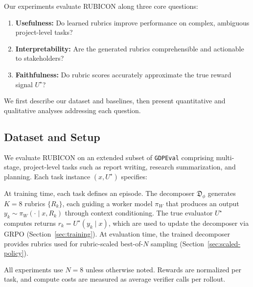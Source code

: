 \documentclass[sigconf]{acmart}
\begin{document}
Our experiments evaluate RUBICON along three core questions:

\begin{enumerate}
    \item \textbf{Usefulness:} Do learned rubrics improve performance on complex, ambiguous project-level tasks?
    \item \textbf{Interpretability:} Are the generated rubrics comprehensible and actionable to stakeholders?
    \item \textbf{Faithfulness:} Do rubric scores accurately approximate the true reward signal \(U^\star\)?
\end{enumerate}

We first describe our dataset and baselines, then present quantitative and qualitative analyses addressing each question.

\subsection{Dataset and Setup}

We evaluate RUBICON on an extended subset of \texttt{GDPEval} comprising multi-stage, project-level tasks such as report writing, research summarization, and planning.
Each task instance $(x, U^\star)$ specifies:

At training time, each task defines an episode.
The decomposer $\mathfrak{D}_\phi$ generates $K{=}8$ rubrics $\{R_k\}$,
each guiding a worker model $\pi_W$ that produces an output 
$y_k \!\sim\! \pi_W(\cdot\mid x,R_k)$ through context conditioning.
The true evaluator $U^\star$ computes returns $r_k = U^\star(y_k\mid x)$,
which are used to update the decomposer via GRPO (Section~\ref{sec:training}).
At evaluation time, the trained decomposer provides rubrics used for rubric-scaled best-of-$N$ sampling (Section~\ref{sec:scaled-policy}).

All experiments use $N{=}8$ unless otherwise noted.
Rewards are normalized per task, and compute costs are measured as average verifier calls per rollout.
\end{document}
